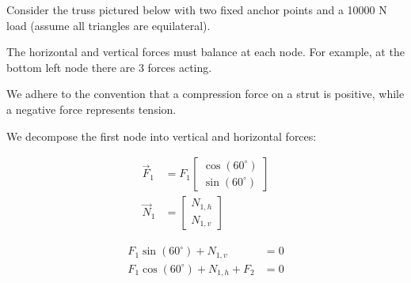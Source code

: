 \begin{applicationActivities}
\begin{observation}
Consider the truss pictured below with two fixed anchor points and a 10000 N load (assume all triangles are equilateral).
\drawtruss

The horizontal and vertical forces must balance at each  node.  For example, at the bottom left node there are 3 forces acting.
\begin{center}
\end{center}

We adhere to the convention that a compression force on a strut is positive, while a negative force represents tension.
\end{observation}

\begin{observation}
\drawtruss[0.8]
We decompose the first node into vertical and horizontal forces:
\begin{multicols}{2}
\begin{center}
\end{center}
%
\begin{align*}
\vec{F}_1 &= F_1\begin{bmatrix} \cos(60^\circ) \\ \sin(60^\circ) \end{bmatrix} \\
\vec{N}_1 &= \begin{bmatrix} N_{1,h} \\ N_{1,v} \end{bmatrix}
\end{align*}
\end{multicols}

\begin{align*}
F_1 \sin(60^\circ)+N_{1,v} &= 0 \\
F_1 \cos(60^\circ)+N_{1,h}+F_2 &= 0
\end{align*}
\end{observation}


\end{applicationActivities}
